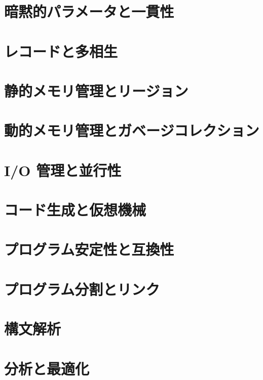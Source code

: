 \documentclass[
  luatex,
  japanese,
  unicode,
  titlepage,
  pdfusetitle
]{ltjsbook}
\begin{document}
\chapter{暗黙的パラメータと一貫性}

\chapter{レコードと多相生}

\chapter{静的メモリ管理とリージョン}

\chapter{動的メモリ管理とガベージコレクション}




\chapter{I/O 管理と並行性}

\chapter{コード生成と仮想機械}

\chapter{プログラム安定性と互換性}

\chapter{プログラム分割とリンク}

\chapter{構文解析}






\chapter{分析と最適化}
\end{document}
